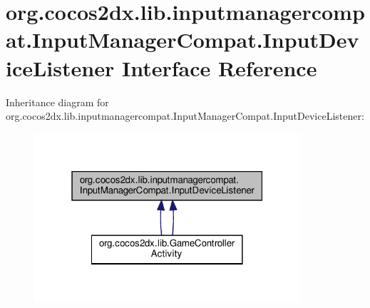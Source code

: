\hypertarget{interfaceorg_1_1cocos2dx_1_1lib_1_1inputmanagercompat_1_1InputManagerCompat_1_1InputDeviceListener}{}\section{org.\+cocos2dx.\+lib.\+inputmanagercompat.\+Input\+Manager\+Compat.\+Input\+Device\+Listener Interface Reference}
\label{interfaceorg_1_1cocos2dx_1_1lib_1_1inputmanagercompat_1_1InputManagerCompat_1_1InputDeviceListener}


Inheritance diagram for org.\+cocos2dx.\+lib.\+inputmanagercompat.\+Input\+Manager\+Compat.\+Input\+Device\+Listener\+:
\nopagebreak
\begin{figure}[H]
\begin{center}
\leavevmode
\includegraphics[width=280pt]{interfaceorg_1_1cocos2dx_1_1lib_1_1inputmanagercompat_1_1InputManagerCompat_1_1InputDeviceListener__inherit__graph}
\end{center}
\end{figure}
